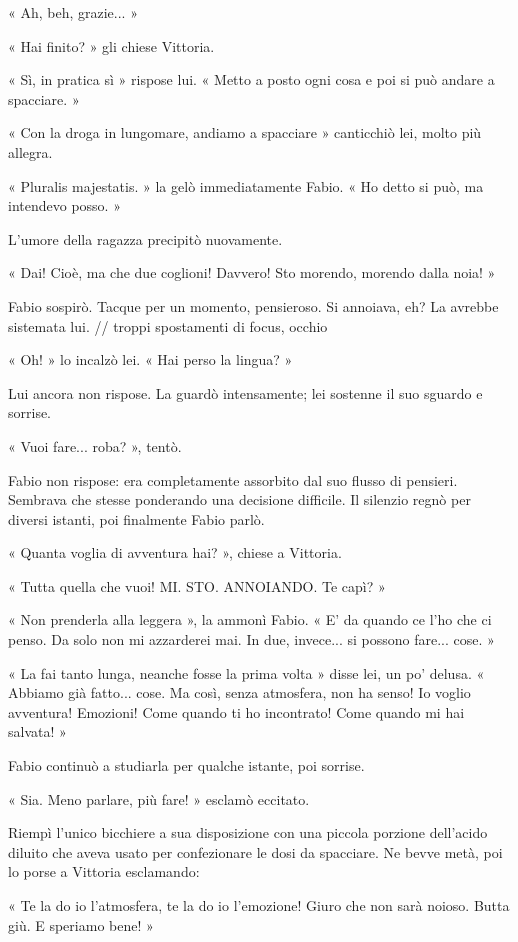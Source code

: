 « Ah, beh, grazie... »

« Hai finito? » gli chiese Vittoria.

« Sì, in pratica sì » rispose lui. « Metto a posto ogni cosa e poi si può andare a spacciare. »

« Con la droga in lungomare, andiamo a spacciare » canticchiò lei, molto più allegra.

« Pluralis majestatis. » la gelò immediatamente Fabio. « Ho detto si può, ma intendevo posso. »

L'umore della ragazza precipitò nuovamente.

« Dai! Cioè, ma che due coglioni! Davvero! Sto morendo, morendo dalla noia! »

Fabio sospirò. Tacque per un momento, pensieroso. Si annoiava, eh? La avrebbe sistemata lui. // troppi spostamenti di focus, occhio

« Oh! » lo incalzò lei. « Hai perso la lingua? »

Lui ancora non rispose. La guardò intensamente; lei sostenne il suo sguardo e sorrise.

« Vuoi fare... roba? », tentò.

Fabio non rispose: era completamente assorbito dal suo flusso di pensieri. Sembrava che stesse ponderando una decisione difficile. Il silenzio regnò per diversi istanti, poi finalmente Fabio parlò.

« Quanta voglia di avventura hai? », chiese a Vittoria.

« Tutta quella che vuoi! MI. STO. ANNOIANDO. Te capì? »

« Non prenderla alla leggera », la ammonì Fabio. « E' da quando ce l'ho che ci penso. Da solo non mi azzarderei mai. In due, invece... si possono fare... cose. »

« La fai tanto lunga, neanche fosse la prima volta » disse lei, un po' delusa. « Abbiamo già fatto... cose. Ma così, senza atmosfera, non ha senso! Io voglio avventura! Emozioni! Come quando ti ho incontrato! Come quando mi hai salvata! »

Fabio continuò a studiarla per qualche istante, poi sorrise.

« Sia. Meno parlare, più fare! » esclamò eccitato.

Riempì l'unico bicchiere a sua disposizione con una piccola porzione dell'acido diluito che aveva usato per confezionare le dosi da spacciare. Ne bevve metà, poi lo porse a Vittoria esclamando:

« Te la do io l'atmosfera, te la do io l'emozione! Giuro che non sarà noioso. Butta giù. E speriamo bene! »

